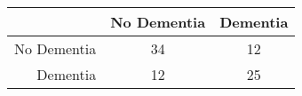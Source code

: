 \begin{table}[ht]
\centering
\begin{tabular}{r|c|c}
  \hline
 & No Dementia & Dementia \\ 
  \hline
No Dementia & 34 & 12 \\ 
  Dementia & 12 & 25 \\ 
   \hline
\end{tabular}
\end{table}
